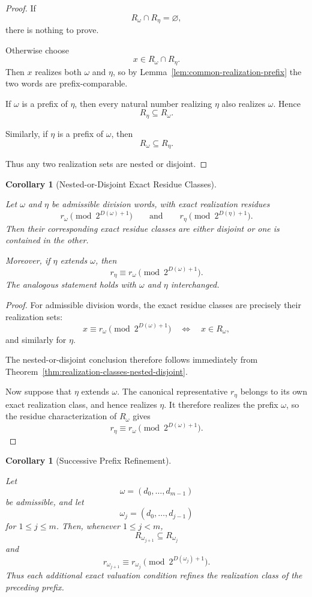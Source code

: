 \documentclass[12pt, oneside]{article}
\numberwithin{equation}{section}
\theoremstyle{definition}
\theoremstyle{plain}
\newtheorem{corollary}[theorem]{Corollary}
\theoremstyle{remark}
\begin{document}
\begin{proof}
If
\[
R_\omega\cap R_\eta=\varnothing,
\]
there is nothing to prove.

Otherwise choose
\[
x\in R_\omega\cap R_\eta.
\]
Then \(x\) realizes both \(\omega\) and \(\eta\), so by
Lemma~\ref{lem:common-realization-prefix} the two words are
prefix-comparable.

If \(\omega\) is a prefix of \(\eta\), then every natural number realizing
\(\eta\) also realizes \(\omega\). Hence
\[
R_\eta\subseteq R_\omega.
\]

Similarly, if \(\eta\) is a prefix of \(\omega\), then
\[
R_\omega\subseteq R_\eta.
\]

Thus any two realization sets are nested or disjoint.
\end{proof}

\begin{corollary}[Nested-or-Disjoint Exact Residue Classes]
\label{cor:exact-residue-classes-nested-disjoint}

Let \(\omega\) and \(\eta\) be admissible division words, with exact
realization residues
\[
r_\omega
\pmod{2^{D(\omega)+1}}
\qquad\text{and}\qquad
r_\eta
\pmod{2^{D(\eta)+1}}.
\]
Then their corresponding exact residue classes are either disjoint or one
is contained in the other.

Moreover, if \(\eta\) extends \(\omega\), then
\[
r_\eta
\equiv
r_\omega
\pmod{2^{D(\omega)+1}}.
\]
The analogous statement holds with \(\omega\) and \(\eta\) interchanged.
\end{corollary}

\begin{proof}
For admissible division words, the exact residue classes are precisely
their realization sets:
\[
x\equiv r_\omega\pmod{2^{D(\omega)+1}}
\quad\Longleftrightarrow\quad
x\in R_\omega,
\]
and similarly for \(\eta\).

The nested-or-disjoint conclusion therefore follows immediately from
Theorem~\ref{thm:realization-classes-nested-disjoint}.

Now suppose that \(\eta\) extends \(\omega\). The canonical representative
\(r_\eta\) belongs to its own exact realization class, and hence realizes
\(\eta\). It therefore realizes the prefix \(\omega\), so the residue
characterization of \(R_\omega\) gives
\[
r_\eta
\equiv
r_\omega
\pmod{2^{D(\omega)+1}}.
\]
\end{proof}

\begin{corollary}[Successive Prefix Refinement]
\label{cor:successive-prefix-refinement}

Let
\[
\omega=(d_0,\dots,d_{m-1})
\]
be admissible, and let
\[
\omega_j=(d_0,\dots,d_{j-1})
\]
for \(1\le j\le m\). Then, whenever \(1\le j<m\),
\[
R_{\omega_{j+1}}\subseteq R_{\omega_j}
\]
and
\[
r_{\omega_{j+1}}
\equiv
r_{\omega_j}
\pmod{2^{D(\omega_j)+1}}.
\]
Thus each additional exact valuation condition refines the realization
class of the preceding prefix.
\end{corollary}
\end{document}
